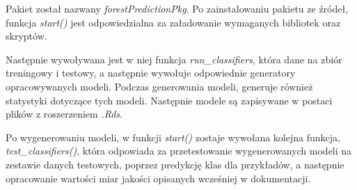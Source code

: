 \documentclass[11pt]{article} %
\begin{document}
Pakiet został nazwany \emph{forestPredictionPkg}. Po zainstalowaniu pakietu ze źródeł, funkcja \emph{start()} jest odpowiedzialna za załadowanie wymaganych bibliotek oraz skryptów. 

Następnie wywoływana jest w niej funkcja \emph{run\_classifiers}, która dane na zbiór treningowy i testowy, a następnie wywołuje odpowiednie generatory opracowywanych modeli. Podczas generowania modeli, generuje również statystyki dotyczące tych modeli. Następnie modele są zapisywane w postaci plików z roszerzeniem \emph{.Rds}.

Po wygenerowaniu modeli, w funkcji  \emph{start()} zostaje wywołana kolejna funkcja, \emph{test\_classifiers()}, która odpowiada za przetestowanie wygenerowanych modeli na zestawie danych testowych, poprzez predykcję klas dla przykładów, a następnie opracowanie wartości miar jakości opisanych wcześniej w dokumentacji.
\end{document}
